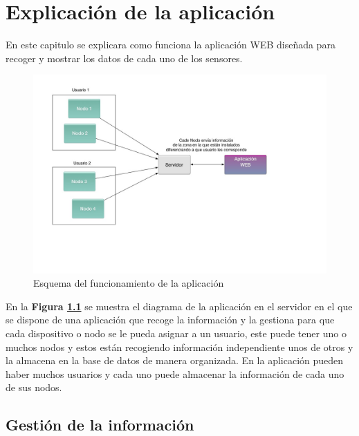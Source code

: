 
\chapter{Explicación de la aplicación}

En este capitulo se explicara como funciona la aplicación WEB diseñada para recoger y mostrar los datos de cada uno de los sensores.

\begin{figure}[!h]
	\centering
	\includegraphics[width=0.9\linewidth]{figuras/montaje2}
	\caption{Esquema del funcionamiento de la aplicación}
	\label{fig:montaje2}
\end{figure}

\setlength{\parindent}{5ex}En la \textbf{Figura \ref{fig:montaje2}} se muestra el diagrama de la aplicación en el servidor en el que se dispone de una aplicación que recoge la información y la gestiona para que cada dispositivo o nodo se le pueda asignar a un usuario, este puede tener uno o muchos nodos y estos están recogiendo información independiente unos de otros y la almacena en la base de datos de manera organizada.
En la aplicación pueden haber muchos usuarios y cada uno puede almacenar la información de cada uno de sus nodos.

\clearpage

\section{Gestión de la información}

